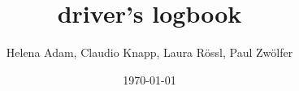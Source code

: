\documentclass[a4paper,final,headinclude=true,footinclude=true, headsepline=1pt]{scrreprt}
\begin{document}
\title{driver's logbook}
\author{Helena Adam, Claudio Knapp, Laura Rössl, Paul Zwölfer}
\date{\today}




















\printglossaries

\nocite{*}
\newpage
{}
\printbibliography
\end{document}
